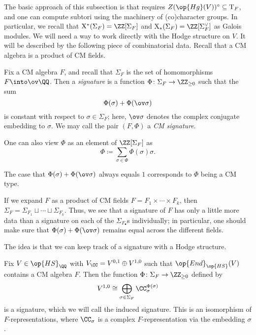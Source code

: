 \documentclass[../thesis.tex]{subfiles}
\begin{document}
The basic approach of this subsection is that  requires $Z(\op{Hg}(V))^\circ\subseteq\mathrm T_F$, and one can compute subtori using the machinery of (co)character groups. In particular, we recall that $\mathrm X^*(\Sigma_F)=\ZZ[\Sigma_F]$ and $\mathrm X_*(\Sigma_F)=\ZZ[\Sigma_F^\lor]$ as Galois modules.
We will need a way to work directly with the Hodge structure on $V$. It will be described by the following piece of combinatorial data. Recall that a CM algebra is a product of CM fields.
\begin{definition}[signature] \label{def:signature}
	Fix a CM algebra $F$, and recall that $\Sigma_F$ is the set of homomorphisms $F\into\ov\QQ$. Then a \textit{signature} is a function $\Phi\colon\Sigma_F\to\ZZ_{\ge0}$ such that the sum
	\[\Phi(\sigma)+\Phi(\ov\sigma)\]
	is constant with respect to $\sigma\in\Sigma_F$; here, $\ov\sigma$ denotes the complex conjugate embedding to $\sigma$. We may call the pair $(F,\Phi)$ a \textit{CM signature}.
\end{definition}
\begin{remark}
	One can also view $\Phi$ as an element of $\ZZ[\Sigma_F]$ as
	\[\Phi\coloneqq\sum_{\sigma\in\Phi}\Phi(\sigma)\sigma.\]
\end{remark}
\begin{remark}
	The case that $\Phi(\sigma)+\Phi(\ov\sigma)$ always equals $1$ corresponds to $\Phi$ being a CM type.
\end{remark}
\begin{remark}
	If we expand $F$ as a product of CM fields $F=F_1\times\cdots\times F_k$, then $\Sigma_F=\Sigma_{F_1}\sqcup\cdots\sqcup\Sigma_{F_k}$. Thus, we see that a signature of $F$ has only a little more data than a signature on each of the $\Sigma_{F_\bullet}$s individually; in particular, one should make sure that $\Phi(\sigma)+\Phi(\ov\sigma)$ remains equal across the different fields.
\end{remark}
The idea is that we can keep track of a signature with a Hodge structure.
\begin{lemma} \label{lem:hodge-to-signature}
	Fix $V\in\op{HS}_\QQ$ with $V_\CC=V^{0,1}\oplus V^{1,0}$ such that $\op{End}_{\op{HS}}(V)$ contains a CM algebra $F$. Then the function $\Phi\colon\Sigma_F\to\ZZ_{\ge0}$ defined by
	\[V^{1,0}\cong\bigoplus_{\sigma\in\Sigma_F}\CC_\sigma^{\Phi(\sigma)}\]
	is a signature, which we will call the induced signature. This is an isomorphism of $F$-representations, where $\CC_\sigma$ is a complex $F$-representa\-tion via the embedding $\sigma$.
\end{lemma}
\end{document}
